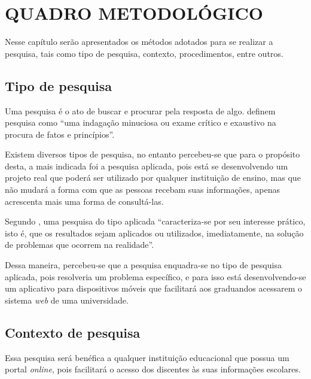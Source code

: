 \chapter{QUADRO METODOLÓGICO}

	\par Nesse capítulo serão apresentados os métodos adotados para se realizar a
pesquisa, tais como tipo de pesquisa, contexto, procedimentos, entre outros.

\section{Tipo de pesquisa}
	
	\par Uma pesquisa é o ato de buscar e procurar pela resposta de algo.
 definem pesquisa como “uma indagação minuciosa
ou exame crítico e exaustivo na procura de fatos e princípios”.

	\par Existem diversos tipos de pesquisa, no entanto percebeu-se que para o
propósito desta, a mais indicada foi a pesquisa aplicada, pois está se
desenvolvendo um projeto real que poderá ser utilizado por qualquer instituição
de ensino, mas que não mudará a forma com que as pessoas recebam suas
informações, apenas acrescenta mais uma forma de consultá-las.

	\par Segundo , uma pesquisa do tipo aplicada
“caracteriza-se por seu interesse prático, isto é, que os resultados sejam
aplicados ou utilizados, imediatamente, na solução de problemas que ocorrem na
realidade”.

	\par Dessa maneira, percebeu-se que a pesquisa enquadra-se no tipo de pesquisa
aplicada, pois resolveria um problema específico, e para isso está
desenvolvendo-se um aplicativo para dispositivos móveis que facilitará aos
graduandos acessarem o sistema \textit{web} de uma universidade.

\section{Contexto de pesquisa}

	\par Essa pesquisa será benéfica a qualquer instituição educacional que possua
um portal \textit{online}, pois facilitará o acesso dos discentes às suas
informações escolares.

